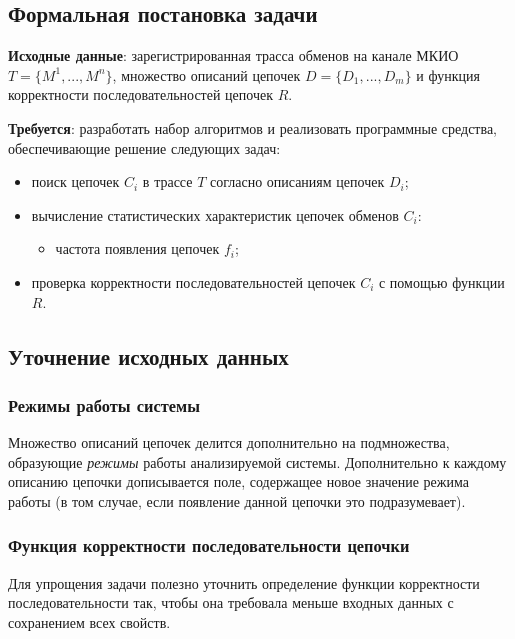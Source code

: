 \subsection{Формальная постановка задачи}

\textbf{Исходные данные}: зарегистрированная трасса обменов на канале МКИО $T = 
\{ M^1, ..., M^n \}$, множество описаний цепочек $D = \{ D_1, ..., D_m \}$ и 
функция корректности последовательностей цепочек $R$.

\textbf{Требуется}: разработать набор алгоритмов и реализовать программные 
средства, обеспечивающие решение следующих задач:

\begin{itemize}
 \item поиск цепочек $C_i$ в трассе $T$ согласно 
описаниям цепочек $D_i$;
 \item вычисление статистических характеристик цепочек обменов $C_i$:
 \begin{itemize}
  \item частота появления цепочек $f_i$;
 \end{itemize}
 \item проверка корректности последовательностей цепочек $C_i$ с помощью 
функции $R$.

\end{itemize}

\subsection{Уточнение исходных данных}

\subsubsection{Режимы работы системы}

Множество описаний цепочек делится дополнительно на подмножества, образующие 
\textit{режимы} работы анализируемой системы. Дополнительно к каждому описанию 
цепочки дописывается поле, содержащее новое значение режима работы (в том 
случае, если появление данной цепочки это подразумевает).

\subsubsection{Функция корректности последовательности цепочки}

Для упрощения задачи полезно уточнить определение функции корректности 
последовательности так, чтобы она требовала меньше входных данных с сохранением 
всех свойств.

